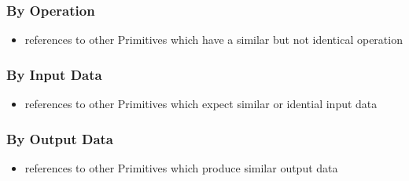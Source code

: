 \documentclass[../../main.tex]{subfiles}
\begin{document}
\subsubsection{By Operation}

\begin{itemize}

\item references to other Primitives which have a similar but not identical operation

\end{itemize}

\subsubsection{By Input Data}

\begin{itemize}

\item references to other Primitives which expect similar or idential input data

\end{itemize}

\subsubsection{By Output Data}

\begin{itemize}

\item references to other Primitives which produce similar output data

\end{itemize}
\end{document}
